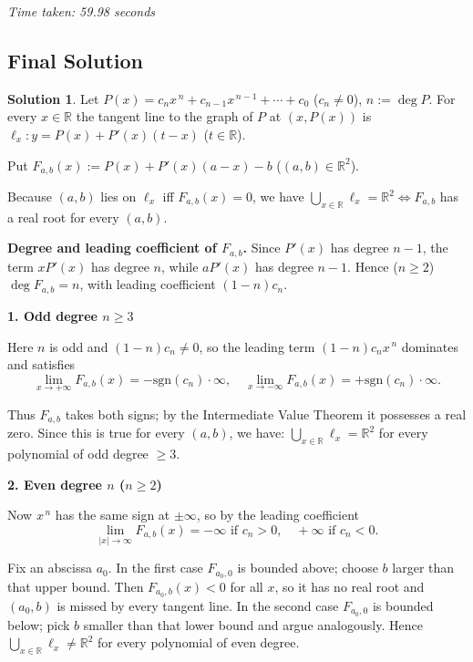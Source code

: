 \documentclass[12pt,a4paper]{article}
\theoremstyle{definition}
\newtheorem{solution}{Solution}
\begin{document}
    \textit{Time taken: 59.98 seconds}

    \subsection{Final Solution}
    \begin{solution}
        Let $P(x)=c_nx^{\,n}+c_{n-1}x^{\,n-1}+\cdots+c_0$ ($c_n\neq0$), $n:=\deg P$. For every $x\in\mathbb{R}$ the tangent line to the graph of $P$ at $(x ,P(x))$ is $\ell_x : y = P(x)+P'(x)(t-x)$ ($t\in\mathbb{R}$).

        Put $F_{a,b}(x):=P(x)+P'(x)(a-x)-b$ ($(a,b)\in\mathbb{R}^2$).

        Because $(a ,b)$ lies on $\ell_x$ iff $F_{a,b}(x)=0$, we have $\bigcup_{x\in\mathbb{R}}\ell_x = \mathbb{R}^2 \Leftrightarrow F_{a,b}$ has a real root for every $(a,b)$.

        \textbf{Degree and leading coefficient of $F_{a,b}$.} Since $P'(x)$ has degree $n-1$, the term $xP'(x)$ has degree $n$, while $aP'(x)$ has degree $n-1$. Hence ($n\geq2$) $\deg F_{a,b}=n$, with leading coefficient $(1-n)c_n$.

        \textbf{1. Odd degree $n\geq3$}

        Here $n$ is odd and $(1-n)c_n\neq0$, so the leading term $(1-n)c_nx^{\,n}$ dominates and satisfies
        \[\lim_{x\to+\infty}F_{a,b}(x)=-\text{sgn}(c_n)\cdot\infty, \quad \lim_{x\to-\infty}F_{a,b}(x)= +\text{sgn}(c_n)\cdot\infty.\]

        Thus $F_{a,b}$ takes both signs; by the Intermediate Value Theorem it possesses a real zero. Since this is true for every $(a,b)$, we have: $\bigcup_{x\in\mathbb{R}}\ell_x = \mathbb{R}^2$ for every polynomial of odd degree $\geq3$.

        \textbf{2. Even degree $n$ ($n\geq2$)}

        Now $x^{\,n}$ has the same sign at $\pm\infty$, so by the leading coefficient
        \[\lim_{|x|\to\infty}F_{a,b}(x)= -\infty \text{ if } c_n>0, \quad +\infty \text{ if } c_n<0.\]

        Fix an abscissa $a_0$. In the first case $F_{a_0,0}$ is bounded above; choose $b$ larger than that upper bound. Then $F_{a_0,b}(x)<0$ for all $x$, so it has no real root and $(a_0 ,b)$ is missed by every tangent line. In the second case $F_{a_0,0}$ is bounded below; pick $b$ smaller than that lower bound and argue analogously. Hence $\bigcup_{x\in\mathbb{R}}\ell_x \neq \mathbb{R}^2$ for every polynomial of even degree.


\end{solution}
\end{document}
